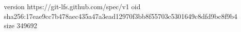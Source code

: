 version https://git-lfs.github.com/spec/v1
oid sha256:17eae9cc7b478aec435a47a3ead12970f3bb8f55703c5301649c8dfd9bc8f9b4
size 349692
